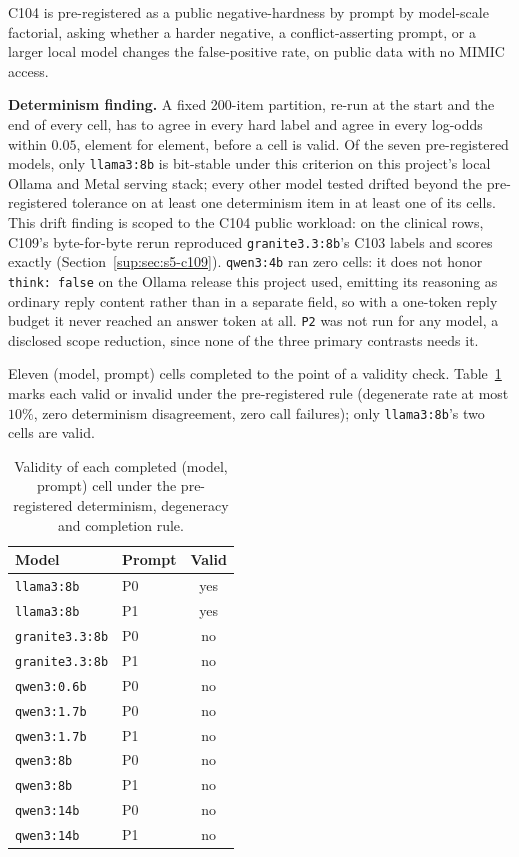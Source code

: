 C104 is pre-registered as a
public negative-hardness by prompt by model-scale factorial, asking whether a
harder negative, a conflict-asserting prompt, or a larger local model changes
the false-positive rate, on public data with no MIMIC access.

\textbf{Determinism finding.} A fixed 200-item partition, re-run at the start
and the end of every cell, has to agree in every hard label and agree in
every log-odds within $0.05$, element for element, before a cell is valid.
Of the seven pre-registered models, only \texttt{llama3:8b} is bit-stable
under this criterion on this project's local Ollama and Metal serving stack;
every other model tested drifted beyond the pre-registered tolerance on at
least one determinism item in at least one of its cells. This drift finding is scoped to the C104
public workload: on the clinical rows, C109's byte-for-byte rerun reproduced
\texttt{granite3.3:8b}'s C103 labels and scores exactly
(Section~\ref{sup:sec:s5-c109}). \texttt{qwen3:4b}
ran zero cells: it does not honor \texttt{think: false} on the Ollama release
this project used, emitting its reasoning as ordinary reply content rather
than in a separate field, so with a one-token reply budget it never reached
an answer token at all. \texttt{P2} was not run for any model, a disclosed
scope reduction, since none of the three primary contrasts needs it.

Eleven (model, prompt) cells completed to the point of a validity check.
Table~\ref{sup:tab:s5-c104-valid} marks each valid or invalid under the
pre-registered rule (degenerate rate at most $10\%$, zero determinism
disagreement, zero call failures); only \texttt{llama3:8b}'s two cells are
valid.

\begin{table}[H]
\caption[C104 cell validity]{Validity of each completed (model, prompt) cell
under the pre-registered determinism, degeneracy and completion rule.}
\centering
\begin{tabular}{llc}
\toprule
\textbf{Model} & \textbf{Prompt} & \textbf{Valid} \\
\midrule
\texttt{llama3:8b}      & P0 & yes \\
\texttt{llama3:8b}      & P1 & yes \\
\texttt{granite3.3:8b}  & P0 & no \\
\texttt{granite3.3:8b}  & P1 & no \\
\texttt{qwen3:0.6b}     & P0 & no \\
\texttt{qwen3:1.7b}     & P0 & no \\
\texttt{qwen3:1.7b}     & P1 & no \\
\texttt{qwen3:8b}       & P0 & no \\
\texttt{qwen3:8b}       & P1 & no \\
\texttt{qwen3:14b}      & P0 & no \\
\texttt{qwen3:14b}      & P1 & no \\
\bottomrule
\end{tabular}
\label{sup:tab:s5-c104-valid}
\end{table}

